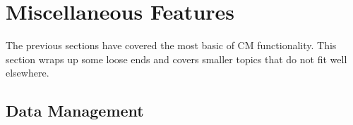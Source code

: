 \documentclass[11pt]{article}
\begin{document}
\section{Miscellaneous Features}
The previous sections have covered the most basic of CM
functionality.  This section wraps up some loose ends and covers smaller
topics that do not fit well elsewhere.


\subsection{Data Management}
\end{document}

